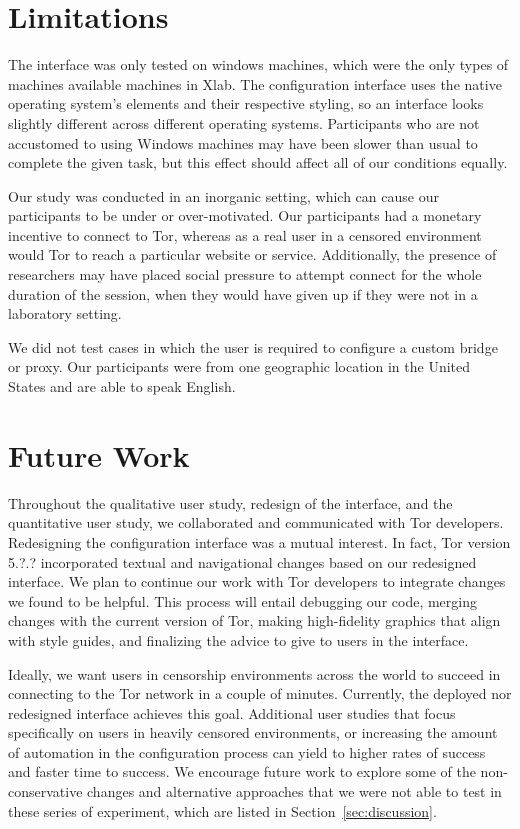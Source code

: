 \documentclass[USenglish,oneside,twocolumn]{article}
\begin{document}
\section{Limitations} 
The interface was only tested on windows machines, which were the only types of machines available machines in Xlab. The configuration interface uses the native operating system's elements and their respective styling, so an interface looks slightly different across different operating systems. Participants who are not accustomed to using Windows machines may have been slower than usual to complete the given task, but this effect should affect all of our conditions equally. 

Our study was conducted in an inorganic setting, which can cause our participants to be under or over-motivated. Our participants had a monetary incentive  to connect to Tor, whereas as a real user in a censored environment would Tor to reach a particular website or service. Additionally, the presence of researchers may have placed social pressure to attempt connect for the whole duration of the session, when they would have given up if they were not in a laboratory setting.   

We did not test cases in which the user is required to configure a custom bridge or proxy. Our participants were from one geographic location in the United States and are able to speak English.

\section{Future Work} 
Throughout the qualitative user study, redesign of the interface, and the quantitative user study, we collaborated and communicated with Tor developers. Redesigning the configuration interface was a mutual interest. In fact, Tor version {\color{red} 5.?.?} incorporated textual and navigational changes based on our redesigned interface. We plan to continue our work with Tor developers to integrate changes we found to be helpful. This process will entail debugging our code, merging changes with the current version of Tor, making high-fidelity graphics that align with style guides, and finalizing the advice to give to users in the interface. 

Ideally, we want users in censorship environments across the world to succeed in connecting to the Tor network in a couple of minutes. Currently, the deployed nor redesigned interface achieves this goal. Additional user studies that focus specifically on users in heavily censored environments, or increasing the amount of automation in the configuration process can yield to higher rates of success and faster time to success. We encourage future work to explore some of the non-conservative changes and alternative approaches that we were not able to test in these series of experiment, which are listed in Section~\ref{sec:discussion}. 
\end{document}
